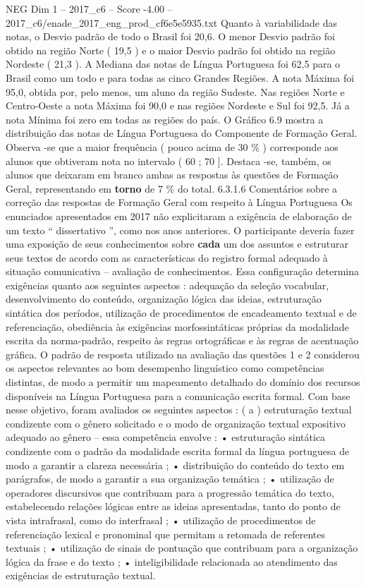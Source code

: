 \begin{textsample}{NEG Dim 1 – 2017\_c6 – Score -4.00 – 2017\_c6/enade\_2017\_eng\_prod\_cf6e5e5935.txt}
Quanto à variabilidade das notas, o Desvio padrão de todo o Brasil foi 20,6.
O menor Desvio padrão foi obtido na região Norte ( 19,5 ) e o maior Desvio padrão foi obtido na região Nordeste ( 21,3 ).
A Mediana das notas de Língua Portuguesa foi 62,5 para o Brasil como um todo e para todas as cinco Grandes Regiões.
A nota Máxima foi 95,0, obtida por, pelo menos, um aluno da região Sudeste.
Nas regiões Norte e Centro-Oeste a nota Máxima foi 90,0 e nas regiões Nordeste e Sul foi 92,5.
Já a nota Mínima foi zero em todas as regiões do país.
O Gráfico 6.9 mostra a distribuição das notas de Língua Portuguesa do Componente de Formação Geral.
Observa -se que a maior frequência ( pouco acima de 30 \% ) corresponde aos alunos que obtiveram nota no intervalo ( 60 ; 70 ].
Destaca -se, também, os alunos que deixaram em branco ambas as respostas às questões de Formação Geral, representando em \textbf{torno} de 7 \% do total. 6.3.1.6 Comentários sobre a correção das respostas de Formação Geral com respeito à Língua Portuguesa Os enunciados apresentados em 2017 não explicitaram a exigência de elaboração de um texto “ dissertativo ”, como nos anos anteriores.
O participante deveria fazer uma exposição de seus conhecimentos sobre \textbf{cada} um dos assuntos e estruturar seus textos de acordo com as características do registro formal adequado à situação comunicativa – avaliação de conhecimentos.
Essa configuração determina exigências quanto aos seguintes aspectos : adequação da seleção vocabular, desenvolvimento do conteúdo, organização lógica das ideias, estruturação sintática dos períodos, utilização de procedimentos de encadeamento textual e de referenciação, obediência às exigências morfossintáticas próprias da modalidade escrita da norma-padrão, respeito às regras ortográficas e às regras de acentuação gráfica.
O padrão de resposta utilizado na avaliação das questões 1 e 2 considerou os aspectos relevantes ao bom desempenho linguístico como competências distintas, de modo a permitir um mapeamento detalhado do domínio dos recursos disponíveis na Língua Portuguesa para a comunicação escrita formal.
Com base nesse objetivo, foram avaliados os seguintes aspectos : ( a ) estruturação textual condizente com o gênero solicitado e o modo de organização textual expositivo adequado ao gênero – essa competência envolve : • estruturação sintática condizente com o padrão da modalidade escrita formal da língua portuguesa de modo a garantir a clareza necessária ; • distribuição do conteúdo do texto em parágrafos, de modo a garantir a sua organização temática ; • utilização de operadores discursivos que contribuam para a progressão temática do texto, estabelecendo relações lógicas entre as ideias apresentadas, tanto do ponto de vista intrafrasal, como do interfrasal ; • utilização de procedimentos de referenciação lexical e pronominal que permitam a retomada de referentes textuais ; • utilização de sinais de pontuação que contribuam para a organização lógica da frase e do texto ; • inteligibilidade relacionada ao atendimento das exigências de estruturação textual.

\end{textsample}
